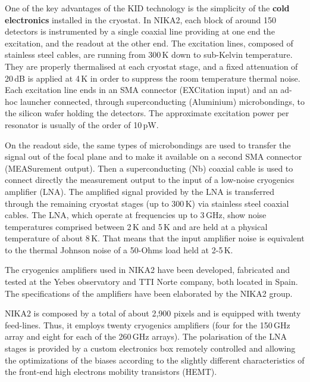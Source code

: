 \documentclass[]{aa} %
\begin{document}
One of the key advantages of the KID technology is the simplicity of the {\bf{cold electronics}} installed in the cryostat.
In NIKA2, each block of around 150 detectors is instrumented by a single coaxial line providing at one end the excitation, and the readout at the other end. The excitation lines, composed of stainless steel cables, are running from 300\,K down to sub-Kelvin temperature. They are properly thermalised at each cryostat stage, and a fixed attenuation of 20\,dB is applied at 4\,K in order to suppress the room temperature thermal noise. Each excitation line ends in an SMA connector (EXCitation input) and an ad-hoc launcher connected, through superconducting (Aluminium) microbondings, to the silicon wafer holding the detectors. The approximate excitation power per resonator is usually of the order of 10\,pW.

On the readout side, the same types of microbondings are used to transfer the signal out of the focal plane and to make it available on a second SMA connector (MEASurement output). Then a superconducting (Nb) coaxial cable is used to connect directly the measurement output to the input of a low-noise cryogenics amplifier (LNA). The amplified signal provided by the LNA is transferred through the remaining cryostat stages (up to 300\,K) via stainless steel coaxial cables. The LNA, which operate at frequencies up to 3\,GHz, show noise temperatures comprised between 2\,K and 5\,K and are held at a physical temperature of about 8\,K. That means that the input amplifier noise is equivalent to the thermal Johnson noise of a 50-Ohms load held at 2-5\,K.

The cryogenics amplifiers used in NIKA2 have been developed, fabricated and tested at the Yebes observatory and TTI Norte company, both located in Spain. The specifications of the amplifiers have been elaborated by the NIKA2 group.

NIKA2 is composed by a total of about 2,900 pixels and is equipped with twenty feed-lines. Thus, it employs twenty cryogenics amplifiers (four for the 150\,GHz array and eight for each of the 260\,GHz arrays). The polarisation of the LNA stages is provided by a custom electronics box remotely controlled and allowing the optimizations of the biases according to the slightly different characteristics of the front-end high electrons mobility transistors (HEMT). 
\end{document}
